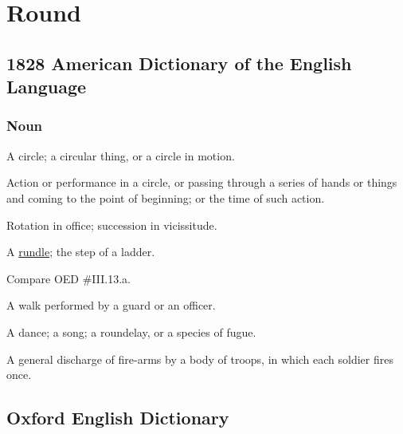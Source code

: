 \section{Round}
	\label{ROUND}
	

\subsection{1828 American Dictionary of the English Language} %
	\label{ROUND-1828}
	
	\subsubsection{Noun}

		\begin{compactitem}
			\item[1] A circle; a circular thing, or a circle in motion.
			\item[2] Action or performance in a circle, or passing through a series of hands or things and coming to the point of beginning; or the time of such action.
			\item[3] Rotation in office; succession in vicissitude.
			\item[4] A \hyperref[RUNDLE]{rundle}; the step of a ladder.
				\begin{compactitem}
					\item Compare OED \#III.13.a.
				\end{compactitem}
			\item[5] A walk performed by a guard or an officer.
			\item[6] A dance; a song; a roundelay, or a species of fugue.
			\item[7] A general discharge of fire-arms by a body of troops, in which each soldier fires once.
		\end{compactitem}

\subsection{Oxford English Dictionary} %
	\label{ROUND-OED}
	
